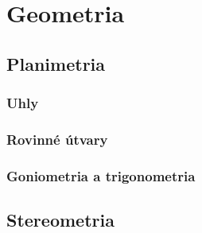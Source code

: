 \chapter{Geometria}

\section{Planimetria}

\subsection{Uhly}

\subsection{Rovinné útvary}

\subsection{Goniometria a trigonometria}

\section{Stereometria}